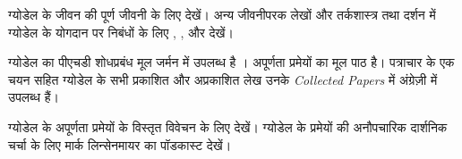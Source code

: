 \documentclass[../../../include/open-logic-section]{subfiles}
\begin{document}
\begin{reading}
ग्योडेल के जीवन की पूर्ण जीवनी के लिए \citet{Dawson1997} देखें। अन्य
जीवनीपरक लेखों और तर्कशास्त्र तथा दर्शन में ग्योडेल के योगदान पर निबंधों के
लिए \citet{Wang1990}, \citet{Baaz2011}, \citet{Takeuti2003} और
\citet{Sigmund2007} देखें।

ग्योडेल का पीएचडी शोधप्रबंध मूल जर्मन में उपलब्ध है \citep{Godel1929}।
अपूर्णता प्रमेयों का मूल पाठ \citep{Godel1931} है। पत्राचार के एक चयन सहित
ग्योडेल के सभी प्रकाशित और अप्रकाशित लेख उनके \emph{Collected Papers}
\citet{Godel1986,Godel1990} में अंग्रेज़ी में उपलब्ध हैं।

ग्योडेल के अपूर्णता प्रमेयों के विस्तृत विवेचन के लिए \citet{Smith2013}
देखें। ग्योडेल के प्रमेयों की अनौपचारिक दार्शनिक चर्चा के लिए मार्क
लिन्सेनमायर का पॉडकास्ट \citep{Linsenmayer2014} देखें।
\end{reading}
\end{document}
